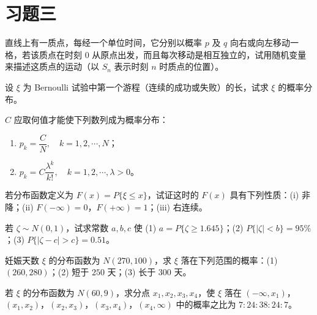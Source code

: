 \documentclass[../../main.tex]{subfiles}
\begin{document}
\section*{习题三}\label{section:ch03-习题三}

\begin{exercise}\label{exercise:ch03-01}
直线上有一质点，每经一个单位时间，它分别以概率 $p$ 及 $q$ 向右或向左移动一格，若该质点在时刻 $0$ 从原点出发，而且每次移动是相互独立的，试用随机变量来描述这质点的运动（以 $S_n$ 表示时刻 $n$ 时质点的位置）。
\end{exercise}

\begin{exercise}\label{exercise:ch03-02}
设 $\xi$ 为 Bernoulli 试验中第一个游程（连续的成功或失败）的长，试求 $\xi$ 的概率分布。
\end{exercise}

\begin{exercise}\label{exercise:ch03-03}
$C$ 应取何值才能使下列数列成为概率分布：
\begin{enumerate}
\item $p_k=\dfrac{C}{N},\quad k=1,2,\cdots,N$；
\item $p_k=C\dfrac{\lambda^{k}}{k!},\quad k=1,2,\cdots,\lambda>0$。
\end{enumerate}
\end{exercise}

\begin{exercise}\label{exercise:ch03-04}
若分布函数定义为 $F(x)=P\{\xi\leqslant x\}$，试证这时的 $F(x)$ 具有下列性质：(i) 非降；(ii) $F(-\infty)=0$，$F(+\infty)=1$；(iii) 右连续。
\end{exercise}

\begin{exercise}\label{exercise:ch03-05}
若 $\zeta\sim N(0,1)$，试求常数 $a,b,c$ 使 (1) $a=P\{\zeta\geqslant 1.645\}$；(2) $P\{|\zeta|<b\}=95\%$；(3) $P\{|\zeta-c|>c\}=0.51$。
\end{exercise}

\begin{exercise}\label{exercise:ch03-06}
妊娠天数 $\xi$ 的分布函数为 $N(270,100)$，求 $\xi$ 落在下列范围的概率：(1) $(260,280)$；(2) 短于 $250$ 天；(3) 长于 $300$ 天。
\end{exercise}

\begin{exercise}\label{exercise:ch03-07}
若 $\xi$ 的分布函数为 $N(60,9)$，求分点 $x_1,x_2,x_3,x_4$，使 $\xi$ 落在 $(-\infty,x_1)$，$(x_1,x_2)$，$(x_2,x_3)$，$(x_3,x_4)$，$(x_4,\infty)$ 中的概率之比为 $7:24:38:24:7$。
\end{exercise}
\end{document}
